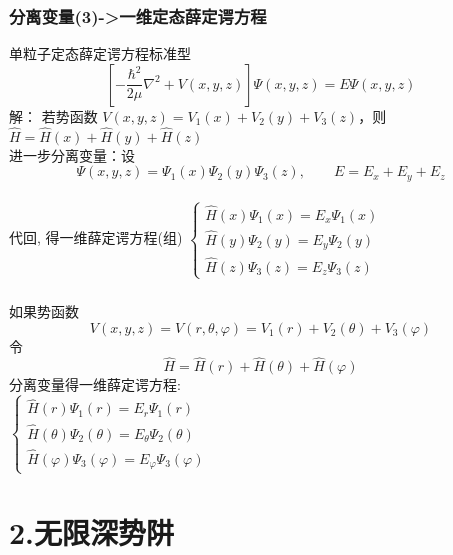 \begin{frame}
	\frametitle{分离变量(3)->一维定态薛定谔方程} 
	单粒子定态薛定谔方程标准型
	\begin{equation*}
		\left [ -\dfrac{\hbar^2}{2\mu }\nabla ^2 + V(x,y,z) \right ]\Psi (x,y,z) =E \Psi (x,y,z)  
	\end{equation*}		
	\alert{解：} 若势函数 $ V(x,y,z)=V_1(x)+V_2(y)+V_3(z) $，则  $ \hat{H}=\hat{H}(x)+\hat{H}(y)+\hat{H}(z) $\\
	进一步分离变量：设  $$\Psi (x,y,z)  = \Psi_1 (x)\Psi_2 (y) \Psi_3 (z), \qquad  E= E_x+ E_y+E_z $$ \\
	代回, 得一维薛定谔方程(组)
	$\displaystyle \begin{cases}
		\hat{H}(x)\Psi_1 (x)=E_x \Psi_1 (x) \\
		\hat{H}(y)\Psi _2 (y)=E_y \Psi _2 (y)  \\
		\hat{H}(z)\Psi _3 (z)=E_z \Psi _3 (z) 
	\end{cases}$ \\	
\end{frame}

\begin{frame}
	\frametitle{}	
	如果势函数 $$ V(x,y,z)=V(r,\theta,\varphi) =V_1(r)+V_2(\theta)+V_3(\varphi) $$
	令  $$ \hat{H}=\hat{H}(r)+\hat{H}(\theta)+\hat{H}(\varphi) $$
	分离变量得一维薛定谔方程:\\
	$\displaystyle \begin{cases}
		\hat{H}(r)\Psi_1 (r)=E_r \Psi_1 (r) \\
		\hat{H}(\theta)\Psi _2 (\theta)=E_\theta \Psi _2 (\theta)  \\
		\hat{H}(\varphi)\Psi _3 (\varphi)=E_\varphi \Psi _3 (\varphi) 
	\end{cases}$ \\	
\end{frame}

\section{2.无限深势阱}

